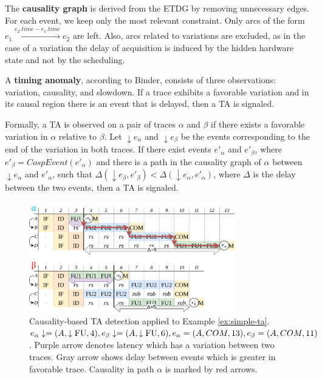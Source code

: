 The \textbf{causality graph} is derived from the ETDG by removing unnecessary edges. For each event, we keep only the most relevant constraint. Only arcs of the form $e_1 \xrightarrow{e_2.time - e_1.time} e_2$ are left. Also, arcs related to variations are excluded, as in the case of a variation the delay of acquisition is induced by the hidden hardware state and not by the scheduling.

A \textbf{timing anomaly}, according to Binder, consists of three observations: variation, causality, and slowdown. If a trace exhibits a favorable variation and in its causal region there is an event that is delayed, then a TA is signaled.

Formally, a TA is observed on a pair of traces $\alpha$ and $\beta$ if there exists a favorable variation in $\alpha$ relative to $\beta$. Let $\downarrow e_\alpha$ and $\downarrow e_\beta$ be the events corresponding to the end of the variation in both traces. If there exist events $e'_\alpha$ and $e'_\beta$, where $e'_\beta = CospEvent(e'_\alpha)$ and there is a path in the causality graph of $\alpha$ between $\downarrow e_\alpha$ and $e'_\alpha$, such that $\Delta(\downarrow e_\beta,e'_\beta) < \Delta(\downarrow e_\alpha,e'_\alpha)$, where $\Delta$ is the delay between the two events, then a TA is signaled.

\begin{figure}[htbp]
    \centering
    \includegraphics[width=0.8\textwidth]{figures/multiscalar_ta_causality.png}
    \caption{Causality-based TA detection applied to Example \ref{ex:simple-ta}. $e_\alpha\downarrow = (A, \downarrow\mathrm{FU}, 4), e_\beta\downarrow = (A, \downarrow\mathrm{FU}, 6), e_\alpha = (A, COM, 13), e_\beta = (A, COM, 11)$. Purple arrow denotes latency which has a variation between two traces. Gray arrow shows delay between events which is greater in favorable trace. Causality in  path $\alpha$ is marked by red arrows.}
    \label{fig:multiscalar-ta-causality}
\end{figure}

